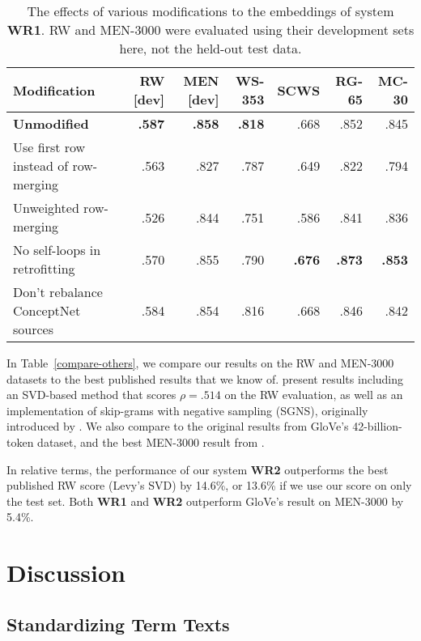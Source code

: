 \documentclass[11pt,letterpaper]{article}
\begin{document}
\begin{table*}[t]
\centering
\begin{tabular}{lrrrrrr}
\toprule
Modification & RW [dev] & MEN [dev] & WS-353 & SCWS &  RG-65 &  MC-30 \\
\midrule
{\bf Unmodified}                     & \bf .587 & \bf .858 & \bf .818 &  .668 &   .852 &   .845 \\
Use first row instead of row-merging & .563 &      .827 &    .787 &  .649 &   .822 &   .794 \\
Unweighted row-merging               & .526 &      .844 &    .751 &  .586 &   .841 &   .836 \\
No self-loops in retrofitting        & .570 &      .855 &    .790 & \bf .676 & \bf .873 & \bf .853 \\
Don't rebalance ConceptNet sources   & .584 &      .854 &    .816 &  .668 &   .846 &   .842 \\
\bottomrule
\end{tabular}
\caption{
    The effects of various modifications to the embeddings of system {\bf WR1}.
    RW and MEN-3000 were evaluated using their development sets here,
    not the held-out test data.
}
\label{eval-variations}
\end{table*}

In Table~\ref{compare-others}, we compare our results on the RW and MEN-3000
datasets to the best published results that we know of.
 present results including an SVD-based method
that scores $\rho = .514$ on the RW evaluation, as well as an implementation
of skip-grams with negative sampling (SGNS), originally introduced by
. We also compare to the original results from
GloVe's 42-billion-token dataset, and the best MEN-3000 result from
.

In relative terms, the performance of our system {\bf WR2} outperforms the best
published RW score (Levy's SVD) by 14.6\%, or 13.6\% if we use our score on only
the test set. Both {\bf WR1} and {\bf WR2} outperform GloVe's result on
MEN-3000 by 5.4\%.

\section{Discussion}


\subsection{Standardizing Term Texts}
\end{document}
